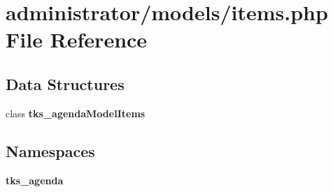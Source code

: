 \section{administrator/models/items.php File Reference}
\label{administrator_2models_2items_8php}
\subsection*{Data Structures}
\begin{DoxyCompactItemize}
\item 
class \textbf{ tks\+\_\+agenda\+Model\+Items}
\end{DoxyCompactItemize}
\subsection*{Namespaces}
\begin{DoxyCompactItemize}
\item 
 \textbf{ tks\+\_\+agenda}
\end{DoxyCompactItemize}
